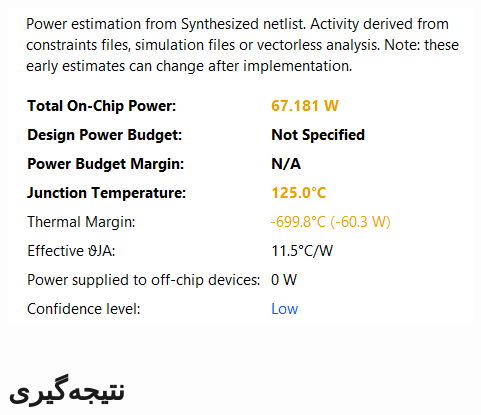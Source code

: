 \documentclass[12pt,titlepage,a4page , tikz , multi,table , svgnames,xcdraw]{article}
\begin{document}
\begin{center} 
\includegraphics[scale=0.65]
    {Images/Implementation/power2.png}\\
    \caption{}
\end{center}





\newpage
\section{نتیجه‌گیری}
\end{document}
